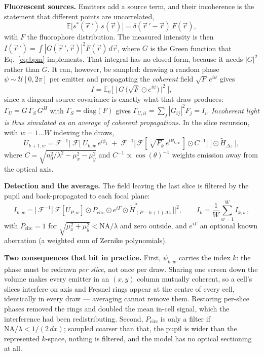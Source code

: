 \documentclass[11pt,a4paper]{article}
\newcommand{\FT}{\mathcal{F}}
\begin{document}
\textbf{Fluorescent sources.} Emitters add a source term, and their incoherence is the
statement that different points are uncorrelated,
\begin{equation}
\mathbb{E}\big[s^*(\vec r\,')\,s(\vec r)\big] = \delta(\vec r\,' - \vec r)\, F(\vec r),
\end{equation}
with $F$ the fluorophore distribution. The measured intensity is then
$I(\vec r\,') = \int |G(\vec r\,',\vec r)|^2 F(\vec r)\, d\vec r$, where $G$ is the
Green function that Eq.~\eqref{eq:bpm} implements. That integral has no closed form,
because it needs $|G|^2$ rather than $G$. It can, however, be sampled: drawing a
random phase $\psi \sim \mathcal{U}[0, 2\pi]$ per emitter and propagating the
\emph{coherent} field $\sqrt{F}\,e^{i\psi}$ gives
\begin{equation}
I = \mathbb{E}_\psi\Big[\;\big|\,G\,\big(\sqrt{F} \odot e^{i\psi}\big)\,\big|^2\;\Big],
\label{eq:mc}
\end{equation}
since a diagonal source covariance is exactly what that draw produces:
$\Gamma_U = G\,\Gamma_S\,G^H$ with $\Gamma_S = \mathrm{diag}(F)$ gives
$\Gamma_{U,ii} = \sum_j |G_{ij}|^2 F_j = I_i$. \emph{Incoherent light is thus
simulated as an average of coherent propagations.} In the slice recursion, with
$w = 1 \ldots W$ indexing the draws,
\begin{equation}
U_{k+1,w} = \FT^{-1}\bigg[\;\FT\Big[\;U_{k,w}\,e^{i\phi_k}
 \;+\; \FT^{-1}\big[\,\FT[\,\sqrt{F_k}\,e^{i\psi_{k,w}}\,] \odot C^{-1}\big]\;\Big]
 \odot \tilde H_{\Delta z}\;\bigg],
\label{eq:src}
\end{equation}
where $C = \sqrt{n_0^2/\lambda^2 - \mu_x^2 - \mu_y^2}$ and $C^{-1} \propto
\cos(\theta)^{-1}$ weights emission away from the optical axis.

\textbf{Detection and the average.} The field leaving the last slice is filtered by
the pupil and back-propagated to each focal plane:
\begin{equation}
I_{k,w} = \Big|\,\FT^{-1}\big[\,\FT[U_{P,w}] \odot P_{\text{circ}} \odot e^{i\Gamma}
 \odot \tilde H^{*}_{(P-k+1)\Delta z}\,\big]\Big|^2 ,
\qquad
I_k = \frac{1}{W}\sum_{w=1}^{W} I_{k,w},
\label{eq:det}
\end{equation}
with $P_{\text{circ}} = 1$ for $\sqrt{\mu_x^2+\mu_y^2} < \mathrm{NA}/\lambda$ and zero
outside, and $e^{i\Gamma}$ an optional known aberration (a weighted sum of Zernike
polynomials).

\textbf{Two consequences that bit in practice.} First, $\psi_{k,w}$ carries the index
$k$: the phase must be redrawn \emph{per slice}, not once per draw. Sharing one screen
down the volume makes every emitter in an $(x,y)$ column mutually coherent, so a
cell's slices interfere on axis and Fresnel rings appear at the centre of every cell,
identically in every draw --- averaging cannot remove them. Restoring per-slice
phases removed the rings and doubled the mean in-cell signal, which the interference
had been redistributing. Second, $P_{\text{circ}}$ is only a filter if
$\mathrm{NA}/\lambda < 1/(2\,dx)$; sampled coarser than that, the pupil is wider than
the represented $k$-space, nothing is filtered, and the model has no optical
sectioning at all.
\end{document}
